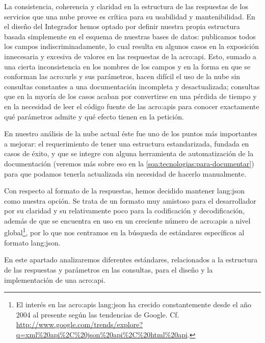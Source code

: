 La consistencia, coherencia y claridad en la estructura de las respuestas de los servicios que una nube provee es crítica para su usabilidad y mantenibilidad. En el diseño del Integrador hemos optado por definir nuestra propia estructura basada simplemente en el esquema de nuestras bases de datos: publicamos todos los campos indiscriminadamente, lo cual resulta en algunos casos en la exposición innecesaria y excesiva de valores en las respuestas de la \gls{acro:api}. Esto, sumado a una cierta inconsistencia en los nombres de los campos y en la forma en que se conforman las \glspl{acro:url} y sus parámetros, hacen difícil el uso de la nube sin consultas constantes a una documentación incompleta y desactualizada; consultas que en la myoría de los casos acaban por convertirse en una pérdida de tiempo y en la necesidad de leer el código fuente de las \glspl{acro:api} para conocer exactamente qué parámetros admite y qué efecto tienen en la petición.

En nuestro análisis de la nube actual éste fue uno de los puntos más importantes a mejorar: el requerimiento de tener una estructura estandarizada, fundada en casos de éxito, y que se integre con alguna herramienta de automatización de la documentación (veremos más sobre eso en la \autoref{soa:tecnologias:para-documentar}) para que podamos tenerla actualizada sin necesidad de hacerlo manualmente.

Con respecto al formato de la respuestas, hemos decidido mantener \gls{lang:json} como nuestra opción. Se trata de un formato muy amistoso para el desarrollador por su claridad y su relativamente poco  para la codificación y decodificación, además de que se encuentra en uso en un creciente número de \glspl{acro:api} a nivel global\footnote{El interés en las \glspl{acro:api} \gls{lang:json} ha crecido constantemente desde el año 2004 al presente según las tendencias de Google. Cf. \url{http://www.google.com/trends/explore?q=xml\%20api\%2C\%20json\%20api\%2C\%20html\%20api}.}, por lo que nos centramos en la búsqueda de estándares específicos al formato \gls{lang:json}.

En este apartado analizaremos diferentes estándares, relacionados a la estructura de las respuestas y parámetros en las consultas, para el diseño y la implementación de una \gls{acro:api}.
